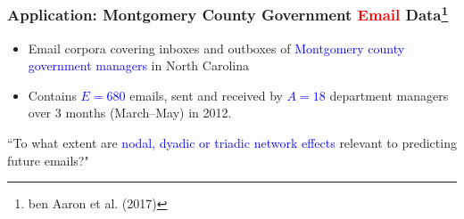 \documentclass{beamer}
\begin{document}
				\begin{frame}
			\frametitle{Application: Montgomery County Government
\textcolor{red}{Email} Data\footnote{\scriptsize ben Aaron et al. (2017)}}
\begin{itemize}
	\item Email corpora covering inboxes and outboxes of \textcolor{blue}{Montgomery county government managers} in North Carolina \vspace{0.15cm}
	\item Contains \textcolor{blue}{$E=680$} emails, sent and received by \textcolor{blue}{$A=18$} department managers over 3 months (March--May) in 2012.\vspace{0.15cm}
			\end{itemize}
					\centering\Large``To what extent are \textcolor{blue}{nodal, dyadic or triadic network effects} relevant to predicting future emails?"
					
		\end{frame}				
\end{document}
